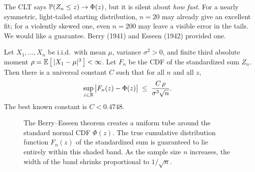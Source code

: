 The CLT says $\P(Z_n \le z) \to \Phi(z)$, but it is silent about \emph{how fast}. For a
nearly symmetric, light-tailed starting distribution, $n = 20$ may already give an
excellent fit; for a violently skewed one, even $n = 200$ may leave a visible error in
the tails. We would like a guarantee. Berry (1941) and Esseen (1942) provided one.

\begin{theorem}
\label{ch21:thm-be}
Let $X_1, \dots, X_n$ be i.i.d.\ with mean $\mu$, variance $\sigma^2 > 0$, and finite
third absolute moment $\rho = \E\big[\,\abs{X_1 - \mu}^3\,\big] < \infty$. Let $F_n$ be
the CDF of the standardized sum $Z_n$. Then there is a universal constant $C$ such that
for all $n$ and all $z$,
\[
  \sup_{z \in \R} \big| F_n(z) - \Phi(z) \big| \;\le\; \frac{C\,\rho}{\sigma^3 \sqrt n}.
\]
The best known constant is $C < 0.4748$.
\end{theorem}

\begin{figure}[H]
\centering
{}
\caption{The Berry--Esseen theorem creates a uniform tube around the standard normal CDF $\Phi(z)$. The true cumulative distribution function $F_n(z)$ of the standardized sum is guaranteed to lie entirely within this shaded band. As the sample size $n$ increases, the width of the band shrinks proportional to $1/\sqrt{n}$.}
\label{ch21:fig-berry-esseen}
\end{figure}



